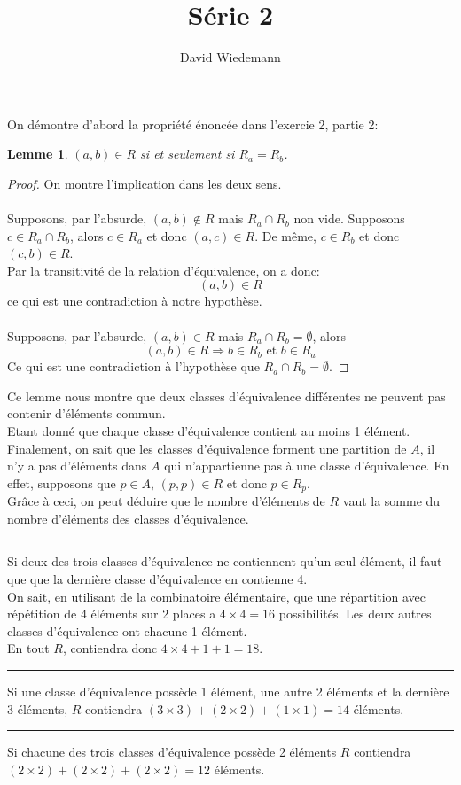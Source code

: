 \documentclass[11pt, a4paper]{article}
\newtheorem{lemma}{Lemme}
\newcommand\hr{
    \noindent\rule[0.5ex]{\linewidth}{0.5pt}\newline
}
\begin{document}
\title{Série 2}
\author{David Wiedemann}
\maketitle
On démontre d'abord la propriété énoncée dans l'exercie 2, partie 2:
\begin{lemma}
	$(a,b) \in R$ si et seulement si $R_a = R_b$.
\end{lemma}
\begin{proof}
On montre l'implication dans les deux sens.\\
\framebox[1.1\width]{$  \Longrightarrow $}\\
Supposons, par l'absurde, $(a,b) \notin R$ mais $R_a \cap R_b$ non vide.
Supposons $ c \in R_a \cap R_b$, alors $c \in R_a$ et donc $(a,c) \in R$.
De même, $c \in R_b$ et donc $(c,b) \in R$.\\
Par la transitivité de la relation d'équivalence, on a donc:
\[ 
	(a,b) \in R
\]
ce qui est une contradiction à notre hypothèse.\\
\framebox[1.1\width]{$  \Longleftarrow $}\\
Supposons, par l'absurde, $(a,b) \in R$ mais $R_a \cap R_b = \emptyset$, alors
\[ 
	( a,b) \in R \Rightarrow b \in R_b \text{ et }  b \in R_a
\]
Ce qui est une contradiction à l'hypothèse que $R_a \cap R_b = \emptyset$.
\end{proof}

Ce lemme nous montre que deux classes d'équivalence différentes ne peuvent pas contenir d'éléments commun.\\
Etant donné que chaque classe d'équivalence contient au moins 1 élément.
Finalement, on sait que les classes d'équivalence forment une partition de $A$, il n'y a pas d'éléments dans $A$ qui n'appartienne pas à une classe d'équivalence. En effet, supposons que $p \in A$, $(p,p) \in R$ et donc $p \in R_p$.\\
Grâce à ceci, on peut déduire que le nombre d'éléments de $R$ vaut la somme du nombre d'éléments des classes d'équivalence.\\
\hr
Si deux des trois classes d'équivalence ne contiennent qu'un seul élément, il faut que que la dernière classe d'équivalence en contienne 4.\\
On sait, en utilisant de la combinatoire élémentaire, que une répartition avec répétition de 4 éléments sur 2 places a  $4\times 4=16$ possibilités.
Les deux autres classes d'équivalence ont chacune 1 élément.\\
En tout $R$, contiendra donc $4\times 4 + 1 + 1=18$.\\
\hr
Si une classe d'équivalence possède 1 élément, une autre 2 éléments et la dernière 3 éléments, $R$ contiendra
$(3\times 3) + (2\times 2) + ( 1 \times 1 ) =14$ éléments.\\
\hr
Si chacune des trois classes d'équivalence possède 2 éléments $R$ contiendra
$ (2 \times 2) + (2 \times 2) +(2 \times 2) = 12$ éléments.
\end{document}
